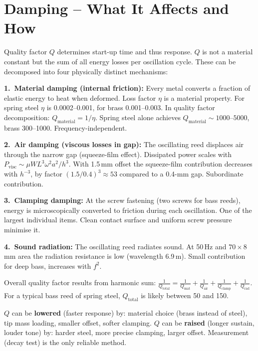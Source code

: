 \documentclass[11pt,a4paper]{article}
\begin{document}
\section{Damping -- What It Affects and How}

Quality factor $Q$ determines start-up time and thus response. $Q$ is not a material constant but the sum of all energy losses per oscillation cycle. These can be decomposed into four physically distinct mechanisms:

\textbf{1.\ Material damping (internal friction):} Every metal converts a fraction of elastic energy to heat when deformed. Loss factor $\eta$ is a material property. For spring steel $\eta$ is 0.0002--0.001, for brass 0.001--0.003. In quality factor decomposition: $Q_\text{material} = 1/\eta$. Spring steel alone achieves $Q_\text{material} \sim 1000$--$5000$, brass 300--1000. Frequency-independent.

\textbf{2.\ Air damping (viscous losses in gap):} The oscillating reed displaces air through the narrow gap (squeeze-film effect). Dissipated power scales with $P_\text{visc} \sim \mu W L^3 \omega^2 a^2 / h^3$. With 1.5\,mm offset the squeeze-film contribution decreases with $h^{-3}$, by factor $(1.5/0.4)^3 \approx 53$ compared to a 0.4-mm gap. Subordinate contribution.

\textbf{3.\ Clamping damping:} At the screw fastening (two screws for bass reeds), energy is microscopically converted to friction during each oscillation. One of the largest individual items. Clean contact surface and uniform screw pressure minimise it.

\textbf{4.\ Sound radiation:} The oscillating reed radiates sound. At 50\,Hz and $70 \times 8$\,mm area the radiation resistance is low (wavelength 6.9\,m). Small contribution for deep bass, increases with $f^2$.

\begin{keybox}
Overall quality factor results from harmonic sum: $\frac{1}{Q_\text{total}} = \frac{1}{Q_\text{mat}} + \frac{1}{Q_\text{air}} + \frac{1}{Q_\text{clamp}} + \frac{1}{Q_\text{rad}}$. For a typical bass reed of spring steel, $Q_\text{total}$ is likely between 50 and 150.
\end{keybox}

$Q$ can be \textbf{lowered} (faster response) by: material choice (brass instead of steel), tip mass loading, smaller offset, softer clamping. $Q$ can be \textbf{raised} (longer sustain, louder tone) by: harder steel, more precise clamping, larger offset. Measurement (decay test) is the only reliable method.
\end{document}
